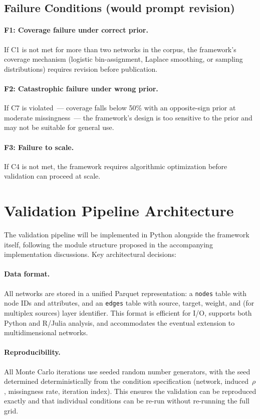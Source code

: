 \documentclass[11pt]{article}
\begin{document}
\subsection{Failure Conditions (would prompt revision)}

\paragraph{F1: Coverage failure under correct prior.} If C1 is not met for more than two networks in the corpus, the framework's coverage mechanism (logistic bin-assignment, Laplace smoothing, or sampling distributions) requires revision before publication.

\paragraph{F2: Catastrophic failure under wrong prior.} If C7 is violated~--- coverage falls below 50\% with an opposite-sign prior at moderate missingness~--- the framework's design is too sensitive to the prior and may not be suitable for general use.

\paragraph{F3: Failure to scale.} If C4 is not met, the framework requires algorithmic optimization before validation can proceed at scale.

\section{Validation Pipeline Architecture}

The validation pipeline will be implemented in Python alongside the framework itself, following the module structure proposed in the accompanying implementation discussions. Key architectural decisions:

\paragraph{Data format.} All networks are stored in a unified Parquet representation: a \texttt{nodes} table with node IDs and attributes, and an \texttt{edges} table with source, target, weight, and (for multiplex sources) layer identifier. This format is efficient for I/O, supports both Python and R/Julia analysis, and accommodates the eventual extension to multidimensional networks.

\paragraph{Reproducibility.} All Monte Carlo iterations use seeded random number generators, with the seed determined deterministically from the condition specification (network, induced~$\rho$, missingness rate, iteration index). This ensures the validation can be reproduced exactly and that individual conditions can be re-run without re-running the full grid.
\end{document}
